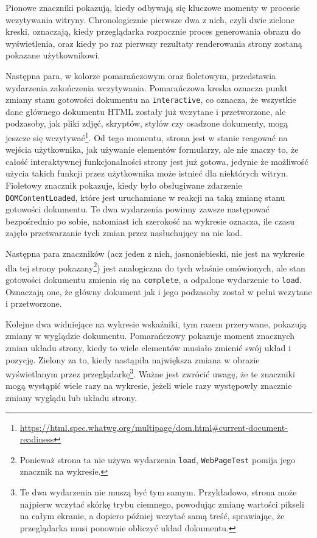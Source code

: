 \documentclass[licencjacka]{pracadypl}
\begin{document}
Pionowe znaczniki pokazują, kiedy odbywają się kluczowe momenty w procesie wczytywania witryny. Chronologicznie pierwsze dwa z nich, czyli dwie zielone kreski, oznaczają, kiedy przeglądarka rozpocznie proces generowania obrazu do wyświetlenia, oraz kiedy po raz pierwszy rezultaty renderowania strony zostaną pokazane użytkownikowi. 

Następna para, w kolorze pomarańczowym oraz fioletowym, przedstawia wydarzenia zakończenia wczytywania. Pomarańczowa kreska oznacza punkt zmiany stanu gotowości dokumentu na \texttt{interactive}, co oznacza, że wszystkie dane głównego dokumentu HTML zostały już wczytane i przetworzone, ale podzasoby, jak pliki zdjęć, skryptów, stylów czy osadzone dokumenty, mogą jeszcze się wczytywać\footnote{\url{https://html.spec.whatwg.org/multipage/dom.html\#current-document-readiness}}. Od tego momentu, strona jest w stanie reagować na wejścia użytkownika, jak używanie elementów formularzy, ale nie znaczy to, że całość interaktywnej funkcjonalności strony jest już gotowa, jedynie że możliwość użycia takich funkcji przez użytkownika może istnieć dla niektórych witryn. Fioletowy znacznik pokazuje, kiedy było obsługiwane zdarzenie \texttt{DOMContentLoaded}, które jest uruchamiane w reakcji na taką zmianę stanu gotowości dokumentu. Te dwa wydarzenia powinny zawsze następować bezpośrednio po sobie, natomiast ich szerokość na wykresie oznacza, ile czasu zajęło przetwarzanie tych zmian przez nasłuchujący na nie kod.

Następna para znaczników (acz jeden z nich, jasnoniebieski, nie jest na wykresie dla tej strony pokazany\footnote{Ponieważ strona ta nie używa wydarzenia \texttt{load}, \texttt{WebPageTest} pomija jego znacznik na wykresie.}) jest analogiczna do tych właśnie omówionych, ale stan gotowości dokumentu zmienia się na \texttt{complete}, a odpalone wydarzenie to \texttt{load}. Oznaczają one, że główny dokument jak i jego podzasoby został w pełni wczytane i przetworzone. 

Kolejne dwa widniejące na wykresie wskaźniki, tym razem przerywane, pokazują zmiany w wyglądzie dokumentu. Pomarańczowy pokazuje moment znacznych zmian układu strony, kiedy to wiele elementów musiało zmienić swój układ i pozycję. Zielony za to, kiedy nastąpiła największa zmiana w obrazie wyświetlanym przez przeglądarkę\footnote{Te dwa wydarzenia nie muszą być tym samym. Przykładowo, strona może najpierw wczytać skórkę trybu ciemnego, powodując zmianę wartości pikseli na całym ekranie, a dopiero później wczytać samą treść, sprawiając, że przeglądarka musi ponownie obliczyć układ dokumentu.}. Ważne jest zwrócić uwagę, że te znaczniki mogą wystąpić wiele razy na wykresie, jeżeli wiele razy występowły znacznie zmiany wyglądu lub układu strony. %
\end{document}
